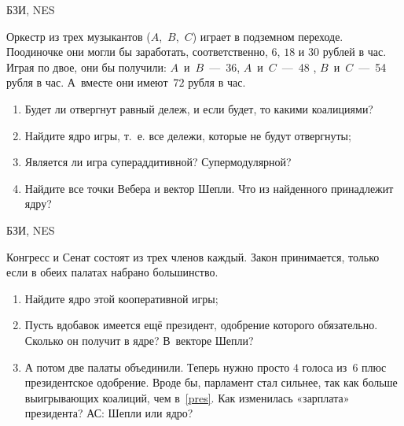 \begin{problem} 
\begin{source}
БЗИ, NES
\end{source}
 Оркестр из трех музыкантов
($A$,~$B$,~$C$) играет в подземном переходе. Поодиночке они
могли бы заработать, соответственно, $6$, $18$ и $30$
рублей в час. Играя по двое, они бы получили:
$A$~и~$B$~—~36, $A$~и~$C$~—~48 , $B$~и~$C$~—~54 рубля в час.
А~вместе они имеют~$72$ рубля в час.

\begin{enumerate}

\item Будет ли отвергнут равный дележ, и если будет, то
какими коалициями?

\item Найдите ядро игры, т.~е. все дележи, которые не будут
отвергнуты;

\item Является ли игра супераддитивной? Супермодулярной?

\item Найдите все точки Вебера и вектор Шепли. Что из
найденного принадлежит ядру?

\end{enumerate}






\begin{sol}

\end{sol}
\end{problem}





\begin{problem} [Парламент.]
\begin{source}
БЗИ, NES
\end{source} Конгресс и Сенат состоят из трех
членов каждый. Закон принимается, только если в обеих
палатах набрано большинство.

\begin{enumerate}

\item Найдите ядро этой кооперативной игры;

\item\label{pres} Пусть вдобавок имеется ещё президент,
одобрение которого обязательно. Сколько он получит в ядре?
В~векторе Шепли?

\item А потом две палаты объединили. Теперь нужно просто
$4$ голоса из~$6$ плюс президентское одобрение. Вроде бы,
парламент стал сильнее, так как больше выигрывающих
коалиций, чем в~\ref{pres}. Как изменилась «зарплата»
президента? {\red АС: Шепли или ядро?}

\end{enumerate}
\begin{sol}

\end{sol}
\end{problem}





